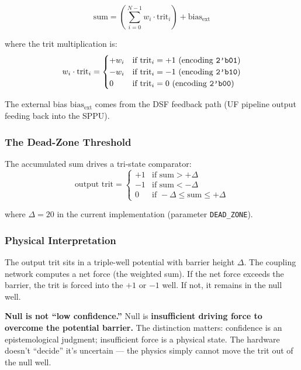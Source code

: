 \documentclass[11pt,a4paper]{article}
\begin{document}
\begin{equation}
\text{sum} = \left(\sum_{i=0}^{N-1} w_i \cdot \text{trit}_i\right) + \text{bias}_{\text{ext}}
\label{eq:field_sum}
\end{equation}

where the trit multiplication is:
\begin{equation}
w_i \cdot \text{trit}_i = \begin{cases}
+w_i & \text{if trit}_i = +1 \text{ (encoding \texttt{2'b01})} \\
-w_i & \text{if trit}_i = -1 \text{ (encoding \texttt{2'b10})} \\
0    & \text{if trit}_i = 0 \text{ (encoding \texttt{2'b00})}
\end{cases}
\end{equation}

The external bias $\text{bias}_{\text{ext}}$ comes from the DSF feedback path (UF pipeline output feeding back into the SPPU).

\subsubsection{The Dead-Zone Threshold}

The accumulated sum drives a tri-state comparator:
\begin{equation}
\text{output trit} = \begin{cases}
+1 & \text{if sum} > +\Delta \\
-1 & \text{if sum} < -\Delta \\
0  & \text{if } -\Delta \leq \text{sum} \leq +\Delta
\end{cases}
\label{eq:deadzone}
\end{equation}

where $\Delta = 20$ in the current implementation (parameter \texttt{DEAD\_ZONE}).

\subsubsection{Physical Interpretation}

The output trit sits in a triple-well potential with barrier height $\Delta$. The coupling network computes a net force (the weighted sum). If the net force exceeds the barrier, the trit is forced into the $+1$ or $-1$ well. If not, it remains in the null well.

\textbf{Null is not ``low confidence.''} Null is \textbf{insufficient driving force to overcome the potential barrier.} The distinction matters: confidence is an epistemological judgment; insufficient force is a physical state. The hardware doesn't ``decide'' it's uncertain --- the physics simply cannot move the trit out of the null well.
\end{document}
